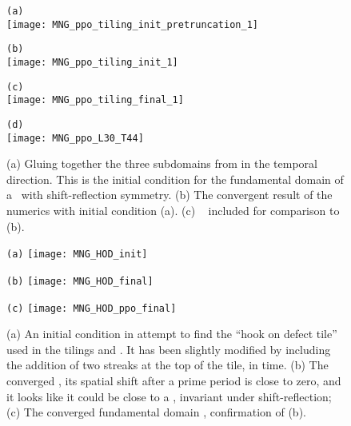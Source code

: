 \begin{itemize}
\begin{figure}
\begin{minipage}[height=.30\textheight]{.6\textwidth}
\centering \small{\texttt{(a)}}\\
\texttt{[image: MNG\_ppo\_tiling\_init\_pretruncation\_1]}
\end{minipage}
\begin{minipage}[height=.30\textheight]{.6\textwidth}
\centering \small{\texttt{(b)}}\\
\texttt{[image: MNG\_ppo\_tiling\_init\_1]}
\end{minipage}
\begin{minipage}[height=.30\textheight]{.6\textwidth}
\centering \small{\texttt{(c)}}\\
\texttt{[image: MNG\_ppo\_tiling\_final\_1]}
\end{minipage}
\begin{minipage}[height=.30\textheight]{.6\textwidth}
\centering \small{\texttt{(d)}}\\
\texttt{[image: MNG\_ppo\_L30\_T44]}
\end{minipage}
\caption{ \label{fig:MNG_ppotiling_one}
(a) Gluing together the three subdomains from 
in the temporal direction. This is the initial condition for the fundamental domain
of a \twot\ with shift-reflection symmetry.
(b) The convergent result of the numerics with initial condition (a).
(c)  \twot\
included for comparison to (b).
}
\end{figure}

\begin{figure}
\begin{minipage}[height=.3\textheight]{.32\textwidth}
\centering \small{\texttt{(a)}}
\texttt{[image: MNG\_HOD\_init]}
\end{minipage}
\begin{minipage}[height=.3\textheight]{.32\textwidth}
\centering \small{\texttt{(b)}}
\texttt{[image: MNG\_HOD\_final]}
\end{minipage}
\begin{minipage}[height=.3\textheight]{.32\textwidth}
\centering \small{\texttt{(c)}}
\texttt{[image: MNG\_HOD\_ppo\_final]}
\end{minipage}
\caption{ \label{fig:MNG_hod_tile}
(a) An initial condition in attempt to find the ``hook on defect tile''
used in the tilings \reffig{fig:MNG_ppotiling_zero} and
. It has been slightly modified by
including the addition of two streaks at the top of the tile, in
time.
(b) The converged \twot, its spatial shift after a prime period is close to zero, and it looks like it could be
close to a \twot, invariant under shift-reflection;
(c) The converged  fundamental domain \twot, confirmation of (b).
}
\end{figure}


\end{itemize}
